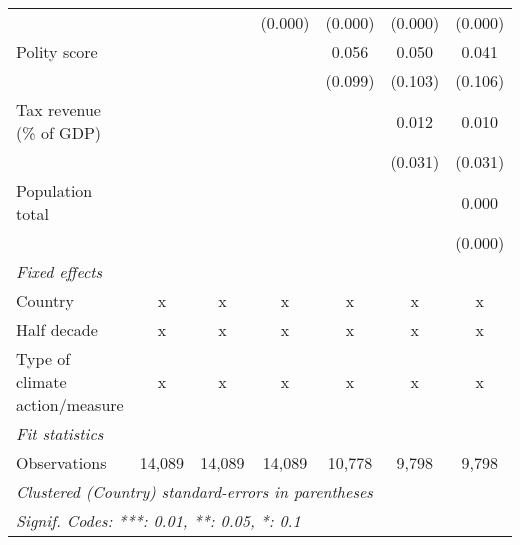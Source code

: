\begin{tabular}{lcccccc}
                                                                                    &               &              & (0.000)       & (0.000)       & (0.000)       & (0.000)\\   
   Polity score                                                                     &               &              &               & 0.056         & 0.050         & 0.041\\   
                                                                                    &               &              &               & (0.099)       & (0.103)       & (0.106)\\   
   Tax revenue (\% of GDP)                                                          &               &              &               &               & 0.012         & 0.010\\   
                                                                                    &               &              &               &               & (0.031)       & (0.031)\\   
   Population total                                                                 &               &              &               &               &               & 0.000\\   
                                                                                    &               &              &               &               &               & (0.000)\\   
   \emph{Fixed effects}\\
   Country                                                                          & x             & x            & x             & x             & x             & x\\  
   Half decade                                                                      & x             & x            & x             & x             & x             & x\\  
   Type of climate action/measure                                                   & x             & x            & x             & x             & x             & x\\  
   \midrule \emph{Fit statistics}\\
   Observations                                                                     & 14,089        & 14,089       & 14,089        & 10,778        & 9,798         & 9,798\\  
   \midrule
   \multicolumn{7}{l}{\emph{Clustered (Country) standard-errors in parentheses}}\\
   \multicolumn{7}{l}{\emph{Signif. Codes: ***: 0.01, **: 0.05, *: 0.1}}\\
\end{tabular}
\par\endgroup


